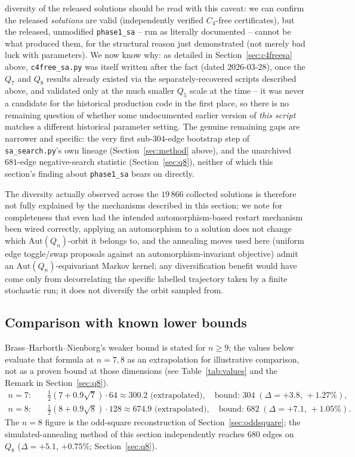 \documentclass[12pt]{article}
\begin{document}
diversity of the released solutions should be read with this caveat:
we can confirm the released \emph{solutions} are valid (independently
verified $C_4$-free certificates), but the released, unmodified
\texttt{phase1\_sa} -- run as literally
documented -- cannot be what produced them, for the structural reason
just demonstrated (not merely bad luck with parameters). We now know why: as detailed in
Section~\ref{sec:c4freesa} above, \texttt{c4free\_sa.py} was itself
written after the fact (dated $2026$-$03$-$28$), once the $Q_7$ and
$Q_8$ results already existed via the separately-recovered scripts
described above, and validated only at the much smaller $Q_5$ scale at
the time -- it was never a candidate for the historical production
code in the first place, so there is no remaining question of whether
some undocumented earlier version of \emph{this script} matches a
different historical parameter setting. The genuine remaining gaps are
narrower and specific: the very first sub-$304$-edge bootstrap step of
\texttt{sa\_search.py}'s own lineage (Section~\ref{sec:method} above),
and the unarchived $681$-edge negative-search statistic
(Section~\ref{sec:q8}), neither of which this section's finding about
\texttt{phase1\_sa} bears on directly.

The diversity actually
observed across the $19\,866$ collected solutions is therefore not
fully explained by the mechanisms described in this section; we note
for completeness that even
had the intended automorphism-based restart mechanism been wired correctly, applying an
automorphism to a solution does not change which $\mathrm{Aut}(Q_n)$-orbit
it belongs to, and the annealing moves used here (uniform edge
toggle/swap proposals against an automorphism-invariant objective) admit
an $\mathrm{Aut}(Q_n)$-equivariant Markov kernel; any diversification
benefit would have come only from decorrelating the specific labelled
trajectory taken by a finite stochastic run; it does not diversify the
orbit sampled from.

\subsection{Comparison with known lower bounds}

Brass--Harborth--Nienborg's weaker bound is stated for $n\ge9$; the
values below evaluate that formula at $n=7,8$ as an extrapolation for
illustrative comparison, not as a proven bound at those dimensions
(see Table~\ref{tab:values} and the Remark in
Section~\ref{sec:q8}).
\begin{align*}
n=7:&\quad\tfrac12(7+0.9\sqrt7)\cdot64\approx300.2\text{ (extrapolated)},\quad\text{bound: }304\;(\Delta=+3.8,\,+1.27\%),\\
n=8:&\quad\tfrac12(8+0.9\sqrt8)\cdot128\approx674.9\text{ (extrapolated)},\quad\text{bound: }682\;(\Delta=+7.1,\,+1.05\%).
\end{align*}
The $n=8$ figure is the odd-square reconstruction of
Section~\ref{sec:oddsquare}; the simulated-annealing method of this section
independently reaches 680 edges on $Q_8$ ($\Delta=+5.1$, $+0.75\%$;
Section~\ref{sec:q8}).
\end{document}
